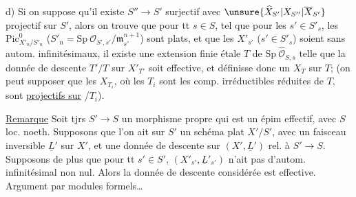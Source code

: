 d) Si on suppose  qu'il existe $S''\to S'$    surjectif
avec $\unsure{\widehat X_{S'}|X_{S''}|\overline X_{S'}}$  projectif sur $S'$, alors on trouve que
pour tt $s\in S$,  tel que pour les $s'\in S'_s$,
les $\mathrm{Pic}^0_{X'_n/S'_n}$ ($S'_n=\mathrm{Sp}\ \mathcal O_{S',s'}/\mathfrak m_{s'}^{n+1}$) sont plats,
et que les $X'_{s'}$ ($s'\in S'_s$) soient sans autom. infinitésimaux,
il existe une extension finie étale $T$ de $\mathrm{Sp}\ \widehat{\mathcal O}_{S,s}$
telle que la donnée de descente  $T'/T$ sur $X'_{T'}$
soit effective, et définisse donc un $X_T$ sur $T$;
(on peut  supposer que les  $X_{T_i}$, où les
$T_i$ sont les comp. irréductibles réduites de $T$, sont
\uline{projectifs sur} /$T_i$).

\uline{Remarque} Soit tjrs $S'\to S$ un morphisme propre
qui est un épim effectif, avec $S$ loc. noeth. Supposons
que l'on ait sur $S'$ un schéma  plat $X'/S'$,
avec un faisceau inversible $\underline L'$ sur $X'$, et une
donnée de descente sur $(X',\underline L')$ rel. à $S'\to S$.
 Supposons de plus que pour tt $s'\in S'$,
$(X'_{s'},\underline L'_{s'})$ n'ait pas d'autom. infinitésimal non nul.
Alors la donnée de descente considérée est
effective. Argument par modules formels\ldots
